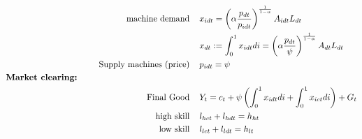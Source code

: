 \begin{align}
\text{machine demand}\hspace{4mm} & x_{idt} = \left(\alpha\frac{ p_{dt}}{p_{idt}}\right)^\frac{1}{1-\alpha}A_{idt}L_{dt}\\
& x_{dt}:=\int_{0}^{1}x_{idt} di= \left(\alpha\frac{p_{dt}}{\psi}\right)^\frac{1}{1-\alpha}A_{dt}L_{dt}\\
\text{Supply machines (price)}\hspace{4mm}& p_{idt}=\psi\\
\text{\textbf{Market clearing:}}\hspace{50mm}& \nonumber\\
\text{Final Good}\hspace{4mm}& Y_{t}=c_t+\psi\left(\int_{0}^1x_{idt}di+\int_{0}^1x_{ict}di\right)+G_t%
\\
\text{high skill}\hspace{4mm}& l_{hct}+l_{hdt}=h_{ht}\\
\text{low skill}\hspace{4mm}&l_{lct}+l_{ldt}=h_{lt}
\end{align}
